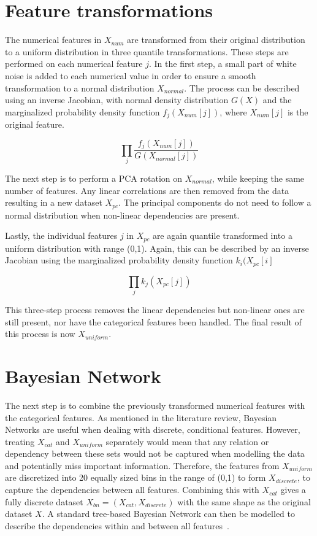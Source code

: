 \section{Feature transformations}
\label{sec:Feat_trans}
The numerical features in $X_{num}$ are transformed from their original distribution to a uniform distribution in three quantile transformations. These steps are performed on each numerical feature $j$. In the first step, a small part of white noise is added to each numerical value in order to ensure a smooth transformation to a normal distribution $X_{normal}$. The process can be described using an inverse Jacobian, with normal density distribution $G(X)$ and the marginalized probability density function $f_j(X_{num}[j])$, where $X_{num}[j]$ is the original feature. 

\begin{equation}
    \prod_{j} \frac{f_j(X_{num}[j])}{G(X_{normal}[j])}
\end{equation}

The next step is to perform a PCA rotation on $X_{normal}$, while keeping the same number of features. Any linear correlations are then removed from the data resulting in a new dataset $X_{pc}$. The principal components do not need to follow a normal distribution when non-linear dependencies are present.

Lastly, the individual features $j$ in $X_{pc}$ are again quantile transformed into a uniform distribution with range (0,1). Again, this can be described by an inverse Jacobian using the marginalized probability density function $k_i(X_{pc}[i]$

\begin{equation}
    \prod_j k_j (X_{pc}[j])
\end{equation}

This three-step process removes the linear dependencies but non-linear ones are still present, nor have the categorical features been handled. The final result of this process is now $X_{uniform}$.

\section{Bayesian Network}
The next step is to combine the previously transformed numerical features with the categorical features. As mentioned in the literature review, Bayesian Networks are useful when dealing with discrete, conditional features. However, treating $X_{cat}$ and $X_{uniform}$ separately would mean that any relation or dependency between these sets would not be captured when modelling the data and potentially miss important information. Therefore, the features from $X_{uniform}$ are discretized into 20 equally sized bins in the range of (0,1) to form $X_{discrete}$, to capture the dependencies between all features. Combining this with $X_{cat}$ gives a fully discrete dataset $X_{bn} = (X_{cat}, X_{discrete})$ with the same shape as the original dataset $X$. A standard tree-based Bayesian Network can then be modelled to describe the dependencies within and between all features~\cite{Chow1968ApproximatingTrees}.

